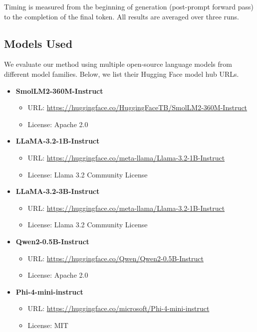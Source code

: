 \documentclass{article} %
\begin{document}
Timing is measured from the beginning of generation (post-prompt forward pass) to the completion of the final token. All results are averaged over three runs.

\subsection{Models Used} \label{appendix:models}

We evaluate our method using multiple open-source language models from different model families. Below, we list their Hugging Face model hub URLs.

\begin{itemize}
    \item \textbf{SmolLM2-360M-Instruct}  
    \begin{itemize}
        \item URL: \url{https://huggingface.co/HuggingFaceTB/SmolLM2-360M-Instruct}
        \item License: Apache 2.0
    \end{itemize}

    \item \textbf{LLaMA-3.2-1B-Instruct}  
    \begin{itemize}
        \item URL: \url{https://huggingface.co/meta-llama/Llama-3.2-1B-Instruct}
        \item License: Llama 3.2 Community License
    \end{itemize}

    \item \textbf{LLaMA-3.2-3B-Instruct}  
    \begin{itemize}
        \item URL: \url{https://huggingface.co/meta-llama/Llama-3.2-1B-Instruct}
        \item License: Llama 3.2 Community License
    \end{itemize}

    \item \textbf{Qwen2-0.5B-Instruct}  
    \begin{itemize}
        \item URL: \url{https://huggingface.co/Qwen/Qwen2-0.5B-Instruct}
        \item License: Apache 2.0
    \end{itemize}

    \item \textbf{Phi-4-mini-instruct}  
    \begin{itemize}
        \item URL: \url{https://huggingface.co/microsoft/Phi-4-mini-instruct}
        \item License: MIT
    \end{itemize}


\end{itemize}
\end{document}
